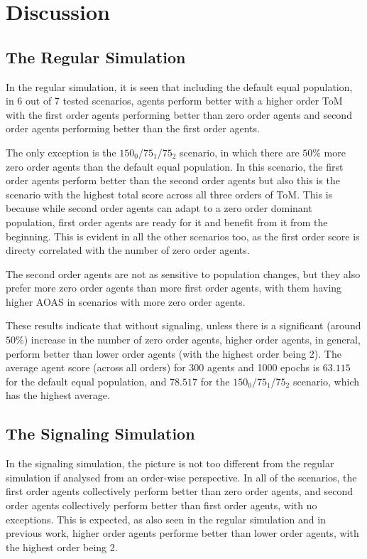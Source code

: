 \section{Discussion}\label{sec:discussion}

\subsection{The Regular Simulation}

In the regular simulation, it is seen that including the default equal population, in 6 out of 7 tested scenarios, agents perform better with a higher order ToM with the first order agents performing better than zero order agents and second order agents performing better than the first order agents. 

The only exception is the $150_{0}$/$75_{1}$/$75_{2}$ scenario, in which there are $50\%$ more zero order agents than the default equal population. In this scenario, the first order agents perform better than the second order agents but also this is the scenario with the highest total score across all three orders of ToM. This is because while second order agents can adapt to a zero order dominant population, first order agents are ready for it and benefit from it from the beginning. This is evident in all the other scenarios too, as the first order score is directy correlated with the number of zero order agents. 

The second order agents are not as sensitive to population changes, but they also prefer more zero order agents than more first order agents, with them having higher AOAS in scenarios with more zero order agents.

These results indicate that without signaling, unless there is a significant (around $50\%$) increase in the number of zero order agents, higher order agents, in general, perform better than lower order agents (with the highest order being 2). The average agent score (across all orders) for 300 agents and 1000 epochs is $\mathbf{63.115
}$ for the default equal population, and $\mathbf{78.517}$ for the $150_{0}$/$75_{1}$/$75_{2}$ scenario, which has the highest average.

\subsection{The Signaling Simulation}

In the signaling simulation, the picture is not too different from the regular simulation if analysed from an order-wise perspective. In all of the scenarios, the first order agents collectively perform better than zero order agents, and second order agents collectively perform better than first order agents, with no exceptions. This is expected, as also seen in the regular simulation and in previous work, higher order agents performe better than lower order agents, with the highest order being 2.


